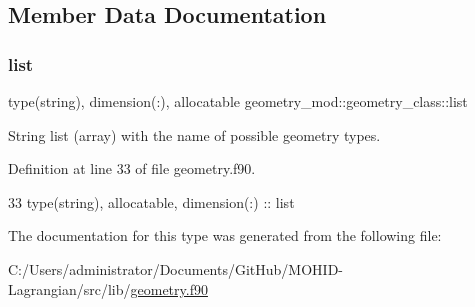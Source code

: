 \subsection{Member Data Documentation}
\mbox{\label{structgeometry__mod_1_1geometry__class_a218ff308d9bb94f4386573d7329babc6}} 
\subsubsection{\texorpdfstring{list}{list}}
{\footnotesize\ttfamily type(string), dimension(\+:), allocatable geometry\+\_\+mod\+::geometry\+\_\+class\+::list\hspace{0.3cm}{\ttfamily [private]}}



String list (array) with the name of possible geometry types. 



Definition at line 33 of file geometry.\+f90.


\begin{DoxyCode}
33         \textcolor{keywordtype}{type}(string), \textcolor{keywordtype}{allocatable}, \textcolor{keywordtype}{dimension(:)} :: list
\end{DoxyCode}


The documentation for this type was generated from the following file\+:\begin{DoxyCompactItemize}
\item 
C\+:/\+Users/administrator/\+Documents/\+Git\+Hub/\+M\+O\+H\+I\+D-\/\+Lagrangian/src/lib/\mbox{\hyperlink{geometry_8f90}{geometry.\+f90}}\end{DoxyCompactItemize}

